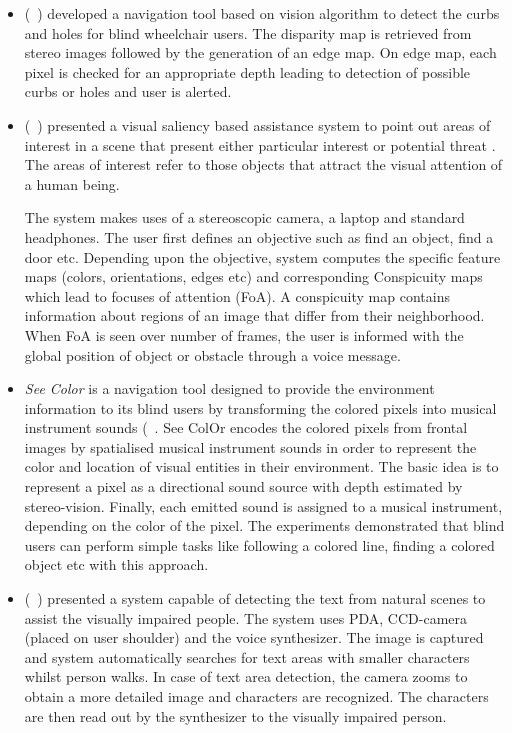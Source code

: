 \begin{itemize}
\item (~\citet{coughlan07}) developed a 
navigation tool based on vision algorithm 
to detect the curbs and holes 
for blind wheelchair users. 
The disparity map is retrieved from stereo images 
followed by the generation of an edge map. 
On edge map, each pixel is checked for 
an appropriate depth leading to detection 
of possible curbs or holes and user is
alerted.

\item (~\citet{beno10}) presented a visual saliency 
based assistance system to point 
out areas of interest in a scene that 
present either particular interest or 
potential threat . 
The areas of interest refer to those 
objects that attract the visual attention 
of a human being. 

The system makes uses of a stereoscopic camera, 
a laptop and standard  headphones. 
The user first defines an objective such as 
find an object, find a door etc. Depending upon 
the objective, system computes the 
specific feature maps (colors, orientations, 
edges etc) and corresponding 
Conspicuity maps which lead to focuses 
of attention (FoA).  A conspicuity map 
contains information about regions of an 
image that differ from their neighborhood. 
When FoA is seen over number of frames, 
the user is informed with the global position of object or 
obstacle through a voice message.

\item \emph{See Color} is a navigation tool designed 
to provide the environment information to its 
blind users by transforming the colored pixels 
into musical instrument sounds (~\citet{beno09}. 
See ColOr encodes the colored pixels from frontal 
images by spatialised musical instrument sounds in order to represent
the color and location of visual entities in their environment. 
The basic idea is to represent a pixel as a directional sound
source with depth estimated by stereo-vision. Finally, each emitted sound is
assigned to a musical instrument, depending on the color of the pixel.
The experiments demonstrated that blind users can 
perform simple tasks like following a colored line, finding a colored 
object etc with this approach. 

\item  (~\citet{ezaki04}) presented a system capable 
of detecting the text from natural scenes 
to assist the visually impaired people. 
The system uses PDA, CCD-camera (placed on user shoulder) 
and the voice synthesizer. The image is captured and system 
automatically searches for text areas with smaller characters 
whilst person walks. In case of text area detection, the camera zooms 
to obtain a more detailed image and characters are 
recognized. The characters are then read out by the synthesizer 
to the visually impaired person. 


\end{itemize}
